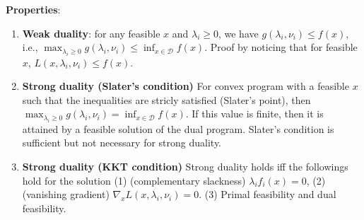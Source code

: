 \textbf{Properties}:
\begin{enumerate}
    \item \textbf{Weak duality}: for any feasible $x$ and $\lambda_i \ge 0$, we have $g(\lambda_i, \nu_i) \le f(x)$, i.e., $\max_{\lambda_i \ge 0} g(\lambda_i, \nu_i) \le \inf_{x\in\mathcal{D}} f(x)$. Proof by noticing that for feasible $x$, $L(x, \lambda_i, \nu_i) \le f(x)$.
    \item \textbf{Strong duality (Slater's condition)} For convex program with a feasible $x$ such that the inequalities are stricly satisfied (Slater's point), then $\max_{\lambda_i \ge 0} g(\lambda_i, \nu_i) = \inf_{x\in\mathcal{D}} f(x)$. If this value is finite, then it is attained by a feasible solution of the dual program. Slater's condition is sufficient but not necessary for strong duality.
    \item \textbf{Strong duality (KKT condition)} Strong duality holds iff the followings hold for the solution (1) (complementary slackness) $\lambda_i f_i(x)=0$, (2) (vanishing gradient) $\nabla_x L(x, \lambda_i, \nu_i) =0$. (3) Primal feasibility and dual feasibility.
\end{enumerate}